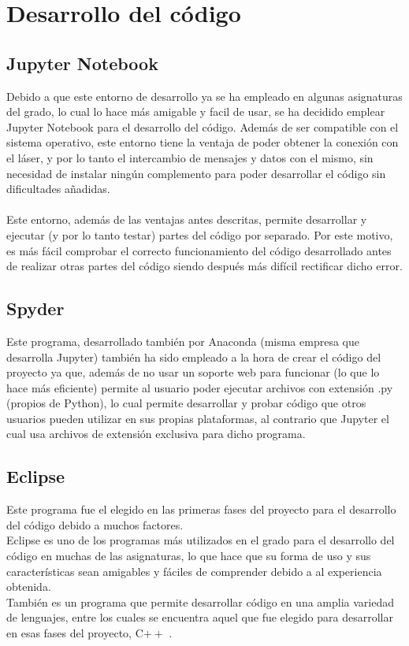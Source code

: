 \section{Desarrollo del código}

\subsection{Jupyter Notebook}

Debido a que este entorno de desarrollo ya se ha empleado en algunas asignaturas del grado, lo cual lo hace más amigable y facil de usar, se ha decidido emplear Jupyter Notebook para el desarrollo del código. Además de ser compatible con el sistema operativo, este entorno tiene la ventaja de poder obtener la conexión con el láser, y por lo tanto el intercambio de mensajes y datos con el mismo, sin necesidad de instalar ningún complemento para poder desarrollar el código sin dificultades añadidas.\\
\\
Este entorno, además de las ventajas antes descritas, permite desarrollar y ejecutar (y por lo tanto testar) partes del código por separado. Por este motivo, es más fácil comprobar el correcto funcionamiento del código desarrollado antes de realizar otras partes del código siendo después más difícil rectificar dicho error.

\subsection{Spyder}

Este programa, desarrollado también por Anaconda (misma empresa que desarrolla Jupyter) también ha sido empleado a la hora de crear el código del proyecto ya que, además de no usar un soporte web para funcionar (lo que lo hace más eficiente) permite al usuario poder ejecutar archivos con extensión .py (propios de Python), lo cual permite desarrollar y probar código que otros usuarios pueden utilizar en sus propias plataformas, al contrario que Jupyter el cual usa archivos de extensión exclusiva para dicho programa.

\subsection{Eclipse}

Este programa fue el elegido en las primeras fases del proyecto para el desarrollo del código debido a muchos factores.\\
Eclipse es uno de los programas más utilizados en el grado para el desarrollo del código en muchas de las asignaturas, lo que hace que su forma de uso y sus características sean amigables y fáciles de comprender debido a al experiencia obtenida.\\
También es un programa que permite desarrollar código en una amplia variedad de lenguajes, entre los cuales se encuentra aquel que fue elegido para desarrollar en esas fases del proyecto, C$++$ . 

